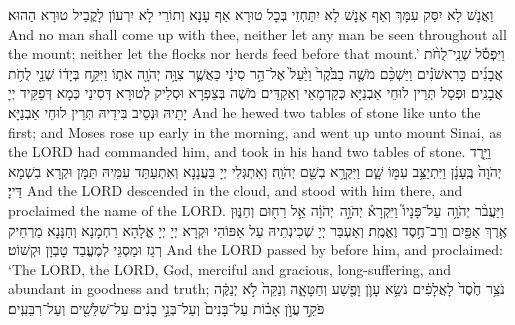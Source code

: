 {{}
{וַאֲנָשׁ לָא יִסַּק עִמָּךְ וְאַף אֶנָשׁ לָא יִתַּחְזֵי בְּכָל טוּרָא אַף עָנָא וְתוֹרֵי לָא יִרְעוֹן לָקֳבֵיל טוּרָא הַהוּא׃}
{And no man shall come up with thee, neither let any man be seen throughout all the mount; neither let the flocks nor herds feed before that mount.’}{}
{וַיִּפְסֹ֡ל שְׁנֵֽי־לֻחֹ֨ת אֲבָנִ֜ים כָּרִאשֹׁנִ֗ים וַיַּשְׁכֵּ֨ם מֹשֶׁ֤ה בַבֹּ֙קֶר֙ וַיַּ֙עַל֙ אֶל־הַ֣ר סִינַ֔י כַּאֲשֶׁ֛ר צִוָּ֥ה יְהֹוָ֖ה אֹת֑וֹ וַיִּקַּ֣ח בְּיָד֔וֹ שְׁנֵ֖י לֻחֹ֥ת אֲבָנִֽים׃}
{וּפְסַל תְּרֵין לוּחֵי אַבְנַיָּא כְּקַדְמָאֵי וְאַקְדֵּים מֹשֶׁה בְּצַפְרָא וּסְלֵיק לְטוּרָא דְּסִינַי כְּמָא דְּפַקֵּיד יְיָ יָתֵיהּ וּנְסֵיב בִּידֵיהּ תְּרֵין לוּחֵי אַבְנַיָּא׃}
{And he hewed two tables of stone like unto the first; and Moses rose up early in the morning, and went up unto mount Sinai, as the LORD had commanded him, and took in his hand two tables of stone.}{}
{וַיֵּ֤רֶד יְהֹוָה֙ בֶּֽעָנָ֔ן וַיִּתְיַצֵּ֥ב עִמּ֖וֹ שָׁ֑ם וַיִּקְרָ֥א בְשֵׁ֖ם יְהֹוָֽה׃
}
{וְאִתְגְּלִי יְיָ בַּעֲנָנָא וְאִתְעַתַּד עִמֵּיהּ תַּמָּן וּקְרָא בִשְׁמָא דַּייָ׃}
{And the LORD descended in the cloud, and stood with him there, and proclaimed the name of the LORD.}{}
{וַיַּעֲבֹ֨ר יְהֹוָ֥ה \pasek  עַל־פָּנָיו֮ וַיִּקְרָא֒ יְהֹוָ֣ה \pasek  יְהֹוָ֔ה אֵ֥ל רַח֖וּם וְחַנּ֑וּן אֶ֥רֶךְ אַפַּ֖יִם וְרַב־חֶ֥סֶד וֶאֱמֶֽת׃
}
{וְאַעְבַּר יְיָ שְׁכִינְתֵיהּ עַל אַפּוֹהִי וּקְרָא יְיָ יְיָ אֱלָהָא רַחְמָנָא וְחַנָּנָא מַרְחֵיק רְגַז וּמַסְגֵּי לְמֶעֱבַד טָבְוָן וּקְשׁוֹט׃}
{And the LORD passed by before him, and proclaimed: ‘The LORD, the LORD, God, merciful and gracious, long-suffering, and abundant in goodness and truth;}{}
{\large נֹ\normalsize צֵ֥ר חֶ֙סֶד֙ לָאֲלָפִ֔ים נֹשֵׂ֥א עָוֺ֛ן וָפֶ֖שַׁע וְחַטָּאָ֑ה וְנַקֵּה֙ לֹ֣א יְנַקֶּ֔ה פֹּקֵ֣ד \legarmeh  עֲוֺ֣ן אָב֗וֹת עַל־בָּנִים֙ וְעַל־בְּנֵ֣י בָנִ֔ים עַל־שִׁלֵּשִׁ֖ים וְעַל־רִבֵּעִֽים׃
}}
